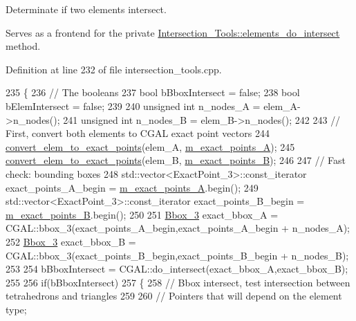 Determinate if two elements intersect. 

Serves as a frontend for the private \hyperlink{classcarl_1_1_intersection___tools_a355a95eefdfdd30b4a332fdd99a11150}{Intersection\+\_\+\+Tools\+::elements\+\_\+do\+\_\+intersect} method. 

Definition at line 232 of file intersection\+\_\+tools.\+cpp.


\begin{DoxyCode}
235 \{
236     \textcolor{comment}{// The booleans}
237     \textcolor{keywordtype}{bool} bBboxIntersect = \textcolor{keyword}{false};
238     \textcolor{keywordtype}{bool} bElemIntersect = \textcolor{keyword}{false};
239 
240     \textcolor{keywordtype}{unsigned} \textcolor{keywordtype}{int} n\_nodes\_A = elem\_A->n\_nodes();
241     \textcolor{keywordtype}{unsigned} \textcolor{keywordtype}{int} n\_nodes\_B = elem\_B->n\_nodes();
242 
243     \textcolor{comment}{// First, convert both elements to CGAL exact point vectors}
244     \hyperlink{classcarl_1_1_intersection___tools_a1d6303ff6ffc19b6df42626e29a507ce}{convert\_elem\_to\_exact\_points}(elem\_A,
      \hyperlink{classcarl_1_1_intersection___tools_ad636117b292272044b252be62124eb0a}{m\_exact\_points\_A});
245     \hyperlink{classcarl_1_1_intersection___tools_a1d6303ff6ffc19b6df42626e29a507ce}{convert\_elem\_to\_exact\_points}(elem\_B,
      \hyperlink{classcarl_1_1_intersection___tools_a2c3b6211dd1f9b0aa5f2ac8ffc383182}{m\_exact\_points\_B});
246 
247     \textcolor{comment}{// Fast check: bounding boxes}
248     std::vector<ExactPoint\_3>::const\_iterator exact\_points\_A\_begin = 
      \hyperlink{classcarl_1_1_intersection___tools_ad636117b292272044b252be62124eb0a}{m\_exact\_points\_A}.begin();
249     std::vector<ExactPoint\_3>::const\_iterator exact\_points\_B\_begin = 
      \hyperlink{classcarl_1_1_intersection___tools_a2c3b6211dd1f9b0aa5f2ac8ffc383182}{m\_exact\_points\_B}.begin();
250 
251     \hyperlink{_c_g_a_l__typedefs_8h_addfe23033005db95e2e48130a55c8a6c}{Bbox\_3} exact\_bbox\_A = CGAL::bbox\_3(exact\_points\_A\_begin,exact\_points\_A\_begin + n\_nodes\_A);
252     \hyperlink{_c_g_a_l__typedefs_8h_addfe23033005db95e2e48130a55c8a6c}{Bbox\_3} exact\_bbox\_B = CGAL::bbox\_3(exact\_points\_B\_begin,exact\_points\_B\_begin + n\_nodes\_B);
253 
254     bBboxIntersect = CGAL::do\_intersect(exact\_bbox\_A,exact\_bbox\_B);
255 
256     \textcolor{keywordflow}{if}(bBboxIntersect)
257     \{
258         \textcolor{comment}{// Bbox intersect, test intersection between tetrahedrons and triangles}
259 
260         \textcolor{comment}{// Pointers that will depend on the element type;}

\end{DoxyCode}
